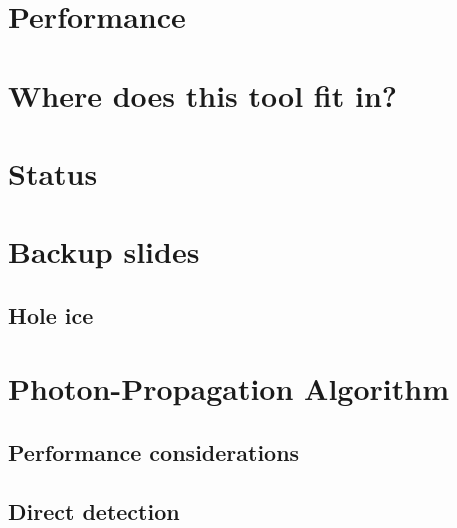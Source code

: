 \documentclass[green, 12pt]{beamer}
\begin{document}
\section{Performance}
  

\section{Where does this tool fit in?}
  

\section{Status}
  

%  

%


\appendix
\section{Backup slides}

\subsection{Hole ice}
  

\section{Photon-Propagation Algorithm}
  
  

\subsection{Performance considerations}
  
  
  

\subsection{Direct detection}
  
\end{document}
